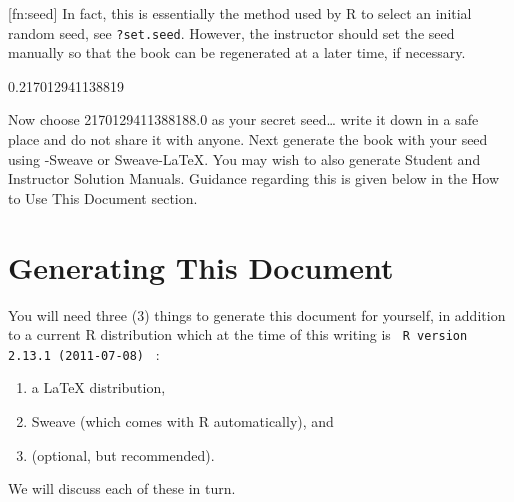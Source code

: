 \documentclass[captions=tableheading]{scrbook}
\begin{document}
[fn:seed] In fact, this is essentially the method used by \textsf{R} to select an initial random seed, see \texttt{?set.seed}. However, the instructor should set the seed manually so that the book can be regenerated at a later time, if necessary.



0.217012941138819

Now choose  2170129411388188.0 as your secret seed\ldots{} write it down in a safe place and do not share it with anyone. Next generate the book with your seed using \LyX{}-Sweave or Sweave-\LaTeX{}. You may wish to also generate Student and Instructor Solution Manuals. Guidance regarding this is given below in the How to Use This Document section.
\section{Generating This Document \label{sec:Generating-This-Document}}
\label{sec-8-1}


You will need three (3) things to generate this document for yourself, in addition to a current \textsf{R} distribution which at the time of this writing is \texttt{  R version 2.13.1 (2011-07-08) } :
\begin{enumerate}
\item a \LaTeX{} distribution,
\item Sweave (which comes with \textsf{R} automatically), and
\item \LyX (optional, but recommended).
\end{enumerate}

We will discuss each of these in turn.
\end{document}

